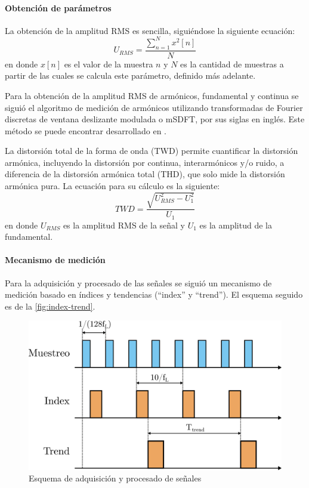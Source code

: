 \documentclass[titlepage, 12pt]{article}
\begin{document}
\paragraph{Obtención de parámetros}
La obtención de la amplitud RMS es sencilla, siguiéndose la siguiente ecuación:
\[
    U_{RMS} = \frac{\sum_{n = 1}^{N}x^2[n]}{N}
\]
en donde $x[n]$ es el valor de la muestra $n$ y $N$ es la cantidad de muestras a partir de las cuales se calcula este parámetro, definido más adelante.

Para la obtención de la amplitud RMS de armónicos, fundamental y continua se siguió el algoritmo de medición de armónicos utilizando transformadas de Fourier discretas de ventana deslizante modulada o mSDFT, por sus siglas en inglés. Este método se puede encontrar desarrollado en \cite{msdft-paper}.

La distorsión total de la forma de onda (TWD) permite cuantificar la distorsión armónica, incluyendo la distorsión por continua, interarmónicos y/o ruido, a diferencia de la distorsión armónica total (THD), que solo mide la distorsión armónica pura. La ecuación para su cálculo es la siguiente:
\[
    TWD = \frac{\sqrt{U_{RMS}^2 - U_1^2}}{U_1}
\]
en donde $U_{RMS}$ es la amplitud RMS de la señal y $U_1$ es la amplitud de la fundamental.


\paragraph{Mecanismo de medición}
Para la adquisición y procesado de las señales se siguió un mecanismo de medición basado en índices y tendencias (``index'' y ``trend''). El esquema seguido es de la \autoref{fig:index-trend}.

    \begin{figure}[!htbp]
        \centering
        \includegraphics[scale=1.2]{diagrams/index-trend.png}
        \caption{Esquema de adquisición y procesado de señales}
        \label{fig:index-trend}
    \end{figure}
\end{document}
